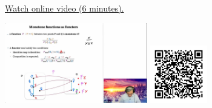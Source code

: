 
\begin{minipage}{10cm}
    \href{https://act4e-spring21.netlify.app/videos/spring2021-functors:semi-and-fun:mon-functions:mon-fun-as-func.html}{Watch online video (6 minutes).}
        
    \href{https://act4e-spring21.netlify.app/videos/spring2021-functors:semi-and-fun:mon-functions:mon-fun-as-func.html}{\includegraphics[height=3.5cm]{spring2021-functors:semi-and-fun:mon-functions:mon-fun-as-func/thumbnails.jpg}}
    \href{https://act4e-spring21.netlify.app/videos/spring2021-functors:semi-and-fun:mon-functions:mon-fun-as-func.html}{\includegraphics[height=2.5cm]{spring2021-functors:semi-and-fun:mon-functions:mon-fun-as-func/qrcode.png}}
\end{minipage}
